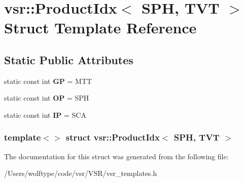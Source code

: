 \hypertarget{structvsr_1_1_product_idx_3_01_s_p_h_00_01_t_v_t_01_4}{\section{vsr\-:\-:Product\-Idx$<$ S\-P\-H, T\-V\-T $>$ Struct Template Reference}
\label{structvsr_1_1_product_idx_3_01_s_p_h_00_01_t_v_t_01_4}
}
\subsection*{Static Public Attributes}
\begin{DoxyCompactItemize}
\item 
\hypertarget{structvsr_1_1_product_idx_3_01_s_p_h_00_01_t_v_t_01_4_a0ed0b52baead762b46d3ec571ee38bb5}{static const int {\bfseries G\-P} = M\-T\-T}\label{structvsr_1_1_product_idx_3_01_s_p_h_00_01_t_v_t_01_4_a0ed0b52baead762b46d3ec571ee38bb5}

\item 
\hypertarget{structvsr_1_1_product_idx_3_01_s_p_h_00_01_t_v_t_01_4_a592242fd51fbc204d88e70a506ce1934}{static const int {\bfseries O\-P} = S\-P\-H}\label{structvsr_1_1_product_idx_3_01_s_p_h_00_01_t_v_t_01_4_a592242fd51fbc204d88e70a506ce1934}

\item 
\hypertarget{structvsr_1_1_product_idx_3_01_s_p_h_00_01_t_v_t_01_4_a4dbe96264dc923194a72bd7edca9328f}{static const int {\bfseries I\-P} = S\-C\-A}\label{structvsr_1_1_product_idx_3_01_s_p_h_00_01_t_v_t_01_4_a4dbe96264dc923194a72bd7edca9328f}

\end{DoxyCompactItemize}
\subsubsection*{template$<$$>$ struct vsr\-::\-Product\-Idx$<$ S\-P\-H, T\-V\-T $>$}



The documentation for this struct was generated from the following file\-:\begin{DoxyCompactItemize}
\item 
/\-Users/wolftype/code/vsr/\-V\-S\-R/vsr\-\_\-templates.\-h\end{DoxyCompactItemize}
